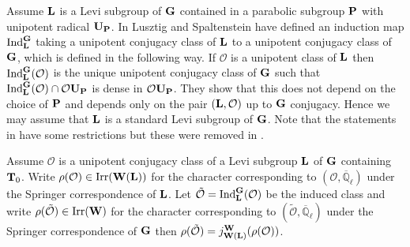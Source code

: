 \documentclass[eqthmnum]{jt-calcs}
\newcommand{\Ql}{\ensuremath{\overline{\mathbb{Q}}_{\ell}}}
\begin{document}
\begin{pa}
Assume $\mathbf{L}$ is a Levi subgroup of $\mathbf{G}$ contained in a parabolic subgroup $\mathbf{P}$ with unipotent radical $\mathbf{U}_{\mathbf{P}}$. In \cite{lusztig-spaltenstein:1979:induced-unipotent-classes} Lusztig and Spaltenstein have defined an induction map $\operatorname{Ind}_{\mathbf{L}}^{\mathbf{G}}$ taking a unipotent conjugacy class of $\mathbf{L}$ to a unipotent conjugacy class of $\mathbf{G}$, which is defined in the following way. If $\mathcal{O}$ is a unipotent class of $\mathbf{L}$ then $\operatorname{Ind}_{\mathbf{L}}^{\mathbf{G}}(\mathcal{O})$ is the unique unipotent conjugacy class of $\mathbf{G}$ such that $\operatorname{Ind}_{\mathbf{L}}^{\mathbf{G}}(\mathcal{O}) \cap \mathcal{O}\mathbf{U}_{\mathbf{P}}$ is dense in $\mathcal{O}\mathbf{U}_{\mathbf{P}}$. They show that this does not depend on the choice of $\mathbf{P}$ and depends only on the pair $(\mathbf{L},\mathcal{O})$ up to $\mathbf{G}$ conjugacy. Hence we may assume that $\mathbf{L}$ is a standard Levi subgroup of $\mathbf{G}$. Note that the statements in \cite{lusztig-spaltenstein:1979:induced-unipotent-classes} have some restrictions but these were removed in \cite{lusztig:1984:intersection-cohomology-complexes}.
\end{pa}

\begin{prop}\label{prop:lusztig-spaltenstein}
Assume $\mathcal{O}$ is a unipotent conjugacy class of a Levi subgroup $\mathbf{L}$ of $\mathbf{G}$ containing $\mathbf{T}_0$. Write $\rho(\mathcal{O}) \in \operatorname{Irr}(\mathbf{W}(\mathbf{L}))$ for the character corresponding to $(\mathcal{O},\Ql)$ under the Springer correspondence of $\mathbf{L}$. Let $\tilde{\mathcal{O}} = \operatorname{Ind}_{\mathbf{L}}^{\mathbf{G}}(\mathcal{O})$ be the induced class and write $\rho(\tilde{\mathcal{O}}) \in \operatorname{Irr}(\mathbf{W})$ for the character corresponding to $(\tilde{\mathcal{O}},\Ql)$ under the Springer correspondence of $\mathbf{G}$ then $\rho(\tilde{\mathcal{O}}) = j_{\mathbf{W}(\mathbf{L})}^{\mathbf{W}}(\rho(\mathcal{O}))$.
\end{prop}
\end{document}

